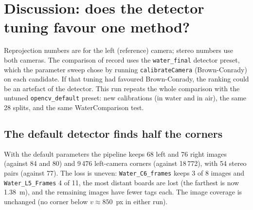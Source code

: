 \section{Discussion: does the detector tuning favour one method?}
Reprojection numbers are for the left (reference) camera; stereo numbers use both cameras. The comparison
of record uses the \texttt{water\_final} detector preset, which the parameter sweep chose by running
\texttt{calibrateCamera} (Brown-Conrady) on each candidate. If that tuning had favoured Brown-Conrady, the
ranking could be an artefact of the detector. This run repeats the whole comparison with the untuned
\texttt{opencv\_default} preset: new calibrations (in water and in air), the same 28 splits, and the same
WaterComparison test.

\subsection{The default detector finds half the corners}
With the default parameters the pipeline keeps 68 left and 76 right images (against 84 and 80) and
9\,476 left-camera corners (against 18\,772), with 54 stereo pairs (against 77). The loss is uneven:
\texttt{Water\_C6\_frames} keeps 3 of 8 images and \texttt{Water\_L5\_Frames} 4 of 11, the most distant
boards are lost (the farthest is now 1.38~m), and the remaining images have fewer tags each. The image
coverage is unchanged (no corner below $v \approx 850$~px in either run).

